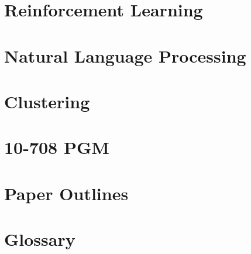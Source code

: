 \documentclass[a4paper, 12pt]{report}
\begin{document}
    \chapter{Reinforcement Learning}

    

    \chapter{Natural Language Processing}

    

    \chapter{Clustering}

    

    \chapter{10-708 PGM}

    

    \chapter{Paper Outlines}

    

    \chapter{Glossary}

    

    \printbibliography
\end{document}
